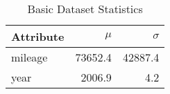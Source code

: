\begin{table}[ht]
\centering
\begin{tabular}{lrr}
  \hline
Attribute & $\mu$ & $\sigma$ \\ 
  \hline
mileage & 73652.4 & 42887.4 \\ 
  year & 2006.9 & 4.2 \\ 
   \hline
\end{tabular}
\caption{Basic Dataset Statistics} 
\label{tab:data_scale}
\end{table}
